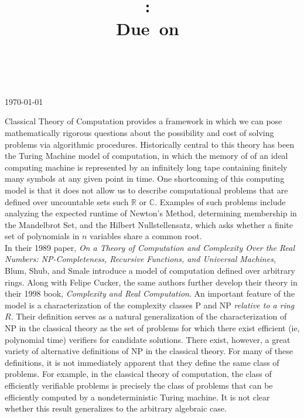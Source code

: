 \documentclass{article}
\title{\vspace{2in}\textmd{\textbf{\hmwkClass:\ \hmwkTitle\ifthenelse{\equal{\hmwkSubTitle}{}}{}{\\\hmwkSubTitle}}}\\\normalsize\vspace{0.1in}\small{Due\ on\ \hmwkDueDate}\\\vspace{0.1in}\large{\textit{\hmwkClassInstructor\ \hmwkClassTime}}\vspace{3in}}
\date{}
\author{\textbf{\hmwkAuthorName}}
\begin{document}
\begin{spacing}{1.1}
  
  \hfill \today

  \vspace{.15in}
  
  \hspace{3pt} Classical Theory of Computation provides a framework in
  which we can pose mathematically rigorous questions about the
  possibility and cost of solving problems via algorithmic procedures.
  Historically central to this theory has been the Turing Machine
  model of computation, in which the memory of of an ideal computing
  machine is represented by an infinitely long tape containing
  finitely many symbols at any given point in time.  One shortcoming
  of this computing model is that it does not allow us to describe
  computational problems that are defined over uncountable sets such
  $\mathbb{R}$ or $\mathbb{C}$.  Examples of such problems include
  analyzing the expected runtime of Newton's Method, determining
  membership in the Mandelbrot Set, and the Hilbert Nullstellensatz,
  which asks whether a finite set of polynomials in $n$ variables
  share a common root. \\

  In their 1989 paper, \emph{On a Theory of Computation and Complexity
    Over the Real Numbers: NP-Completeness, Recursive Functions, and
    Universal Machines}, Blum, Shub, and Smale introduce a model of
  computation defined over arbitrary rings.  Along with Felipe Cucker,
  the same authors further develop their theory in their 1998 book,
  \textit{Complexity and Real Computation}.  An important feature of
  the model is a characterization of the complexity classes P and NP
  \emph{relative to a ring $R$}.  Their definition serves as a natural
  generalization of the characterization of NP in the classical theory
  as the set of problems for which there exist efficient (ie,
  polynomial time) verifiers for candidate solutions.  There exist,
  however, a great variety of alternative definitions of NP in the
  classical theory.  For many of these definitions, it is not
  immediately apparent that they define the same class of
  problems. For example, in the classical theory of computation, the
  class of efficiently verifiable problems is precisely the class of
  problems that can be efficiently computed by a nondeterministic
  Turing machine.  It is not clear whether this result generalizes
  to the arbitrary algebraic case. \\


\end{spacing}
\end{document}
